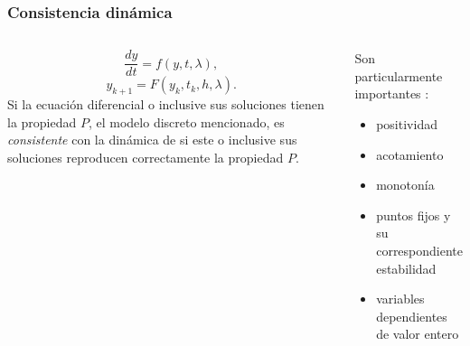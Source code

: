 \begin{bibunit}[aalpha]
  \begin{frame}%
    \frametitle{Consistencia din\'amica}
    \begin{columns}
        \begin{Definicion}
            $$%
              \frac{dy}{dt}=f(y,t,\lambda),
            $$%
            $$%
                y_{k+1}=F(y_k,t_k,h,\lambda).
            $$%
            Si la ecuaci\'on diferencial o inclusive sus soluciones tienen la
            propiedad $P$, el modelo discreto mencionado, es \emph{consistente} con la  din\'amica de
            si este o inclusive sus soluciones reproducen correctamente la
            propiedad  $P$.
          \end{Definicion}
        \begin{beamerboxesrounded}
        [upper=color titulo caja, lower=color cuerpo caja, shadow=true]
        {Son particularmente  importantes   :}
          \begin{itemize}
            \item positividad
            \item acotamiento
            \item monoton\'ia
            \item puntos fijos y su correspondiente estabilidad
            \item variables dependientes de valor entero
          \end{itemize}
        \cite{Mickens}
      \end{beamerboxesrounded}
    \end{columns}
  \end{frame}
\end{bibunit}